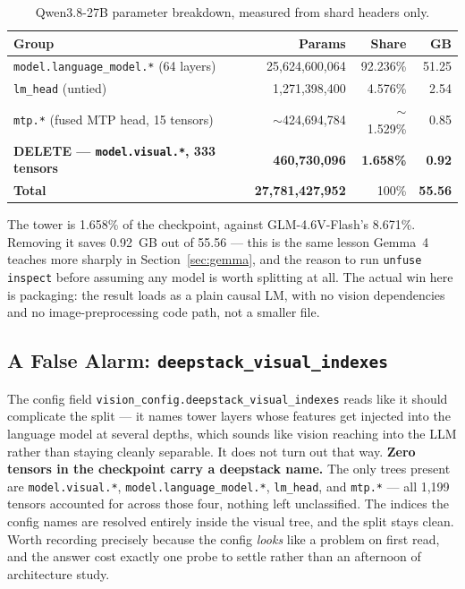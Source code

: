 \documentclass[11pt]{article}
\begin{document}
\begin{table}[h]
\centering
\small
\begin{tabular}{lrrr}
\toprule
Group & Params & Share & GB \\
\midrule
\texttt{model.language\_model.*} (64 layers) & 25,624,600,064 & 92.236\% & 51.25 \\
\texttt{lm\_head} (untied) & 1,271,398,400 & 4.576\% & 2.54 \\
\texttt{mtp.*} (fused MTP head, 15 tensors) & $\sim$424,694,784 & $\sim$1.529\% & 0.85 \\
\midrule
\textbf{DELETE --- \texttt{model.visual.*}, 333 tensors} & \textbf{460,730,096} & \textbf{1.658\%} & \textbf{0.92} \\
\midrule
\textbf{Total} & \textbf{27,781,427,952} & 100\% & \textbf{55.56} \\
\bottomrule
\end{tabular}
\caption{Qwen3.8-27B parameter breakdown, measured from shard headers only.}
\end{table}

The tower is 1.658\% of the checkpoint, against GLM-4.6V-Flash's 8.671\%. Removing it
saves 0.92~GB out of 55.56 --- this is the same lesson Gemma~4 teaches more sharply in
Section~\ref{sec:gemma}, and the reason to run \texttt{unfuse inspect} before assuming
any model is worth splitting at all. The actual win here is packaging: the result loads
as a plain causal LM, with no vision dependencies and no image-preprocessing code path,
not a smaller file.

\subsection{A False Alarm: \texttt{deepstack\_visual\_indexes}}

The config field \texttt{vision\_config.deepstack\_visual\_indexes} reads like it should
complicate the split --- it names tower layers whose features get injected into the
language model at several depths, which sounds like vision reaching into the LLM rather
than staying cleanly separable. It does not turn out that way.
\textbf{Zero tensors in the checkpoint carry a deepstack name.} The only trees present
are \texttt{model.visual.*}, \texttt{model.language\_model.*}, \texttt{lm\_head}, and
\texttt{mtp.*} --- all 1,199 tensors accounted for across those four, nothing left
unclassified. The indices the config names are resolved entirely inside the visual
tree, and the split stays clean. Worth recording precisely because the config
\emph{looks} like a problem on first read, and the answer cost exactly one probe to
settle rather than an afternoon of architecture study.
\end{document}
